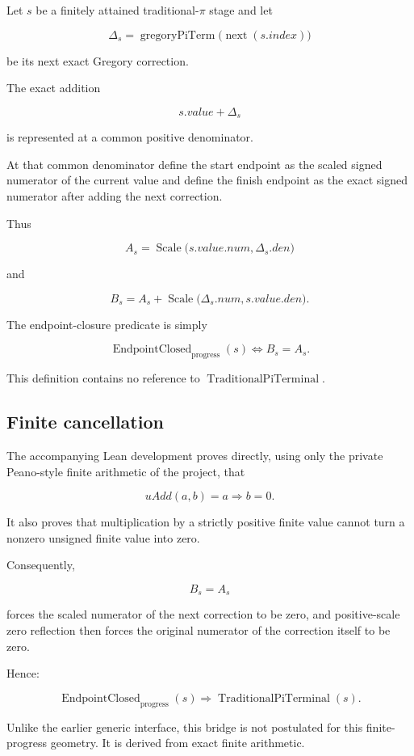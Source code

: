 \documentclass[11pt,a4paper]{article}
\begin{document}
Let \(s\) be a finitely attained traditional-\(\pi\) stage and let

\[
\Delta_s
=
\operatorname{gregoryPiTerm}
\bigl(\operatorname{next}(s.index)\bigr)
\]

be its next exact Gregory correction.

The exact addition

\[
s.value+\Delta_s
\]

is represented at a common positive denominator.

At that common denominator define the start endpoint as the scaled
signed numerator of the current value and define the finish endpoint as
the exact signed numerator after adding the next correction.

Thus

\[
A_s
=
\operatorname{Scale}
\bigl(s.value.num,\Delta_s.den\bigr)
\]

and

\[
B_s
=
A_s+
\operatorname{Scale}
\bigl(\Delta_s.num,s.value.den\bigr).
\]

The endpoint-closure predicate is simply

\[
\operatorname{EndpointClosed}_{\mathrm{progress}}(s)
\iff
B_s=A_s.
\]

This definition contains no reference to
\(\operatorname{TraditionalPiTerminal}\).

\subsection{Finite cancellation}

The accompanying Lean development proves directly, using only the
private Peano-style finite arithmetic of the project, that

\[
uAdd(a,b)=a
\Longrightarrow
b=0.
\]

It also proves that multiplication by a strictly positive finite value
cannot turn a nonzero unsigned finite value into zero.

Consequently,

\[
B_s=A_s
\]

forces the scaled numerator of the next correction to be zero, and
positive-scale zero reflection then forces the original numerator of
the correction itself to be zero.

Hence:

\[
\boxed{
\operatorname{EndpointClosed}_{\mathrm{progress}}(s)
\Longrightarrow
\operatorname{TraditionalPiTerminal}(s).
}
\]

Unlike the earlier generic interface, this bridge is not postulated for
this finite-progress geometry. It is derived from exact finite
arithmetic.
\end{document}
